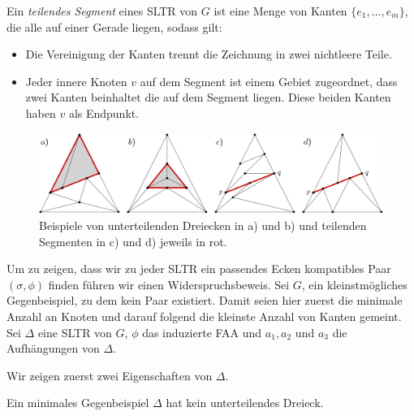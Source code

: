 \begin{definition}
Ein \textit{teilendes Segment} eines SLTR von $G$ ist eine Menge von Kanten $\{e_1, \ldots , e_m\}$, die alle auf einer Gerade liegen, sodass gilt:
\begin{itemize}
\item Die Vereinigung der Kanten trennt die Zeichnung in zwei nichtleere Teile. 
\item Jeder innere Knoten $v$ auf dem Segment ist einem Gebiet zugeordnet, dass zwei Kanten beinhaltet die auf dem Segment liegen. Diese beiden Kanten haben $v$ als Endpunkt.
\end{itemize}
\end{definition}

\begin{figure}[h]
	\centering
	  \includegraphics[width=1\textwidth]{subdividing_ex.png}
    	\caption{Beispiele von unterteilenden Dreiecken in a) und b) und teilenden Segmenten in c) und d) jeweils in rot.}
    	\label{subdividing_ex}
\end{figure}

Um zu zeigen, dass wir zu jeder SLTR ein passendes Ecken kompatibles Paar $(\sigma,\phi)$ finden führen wir einen Widerspruchsbeweis. Sei $G$, ein kleinstmögliches Gegenbeispiel, zu dem kein Paar existiert. Damit seien hier zuerst die minimale Anzahl an Knoten und darauf folgend die kleinste Anzahl von Kanten gemeint. Sei $\Delta$ eine SLTR von $G$, $\phi$ das induzierte FAA und $a_1,a_2$ und $a_3$ die Aufhängungen von $\Delta$.

Wir zeigen zuerst zwei Eigenschaften von $\Delta$.

\begin{lemma}\label{lem2}
Ein minimales Gegenbeispiel $\Delta$ hat kein unterteilendes Dreieck.
\end{lemma}

